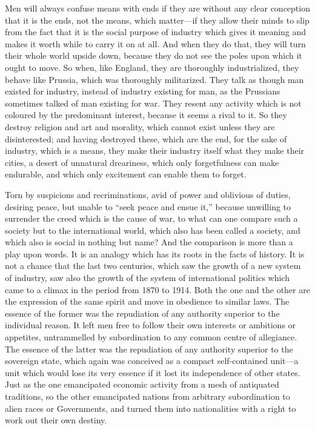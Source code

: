 \documentclass{book}
\begin{document}
Men will always confuse means with ends if they are without any clear conception that it is the ends, not the means, which matter—if they allow their minds to slip from the fact that it is the social purpose of industry which gives it meaning and makes it worth while to carry it on at all. And when they do that, they will turn their whole world upside down, because they do not see the poles upon which it ought to move. So when, like England, they are thoroughly industrialized, they behave like Prussia, which was thoroughly militarized. They talk as though man existed for industry, instead of industry existing for man, as the Prussians sometimes talked of man existing for war. They resent any activity which is not coloured by the predominant interest, because it seems a rival to it. So they destroy religion and art and morality, which cannot exist unless they are disinterested; and having destroyed these, which are the end, for the sake of industry, which is a means, they make their industry itself what they make their cities, a desert of unnatural dreariness, which only forgetfulness can make endurable, and which only excitement can enable them to forget.

Torn by suspicions and recriminations, avid of power and oblivious of duties, desiring peace, but unable to “seek peace and ensue it,” because unwilling to surrender the creed which is the cause of war, to what can one compare such a society but to the international world, which also has been called a society, and which also is social in nothing but name? And the comparison is more than a play upon words. It is an analogy which has its roots in the facts of history. It is not a chance that the last two centuries, which saw the growth of a new system of industry, saw also the growth of the system of international politics which came to a climax in the period from 1870 to 1914. Both the one and the other are the expression of the same spirit and move in obedience to similar laws. The essence of the former was the repudiation of any authority superior to the individual reason. It left men free to follow their own interests or ambitions or appetites, untrammelled by subordination to any common centre of allegiance. The essence of the latter was the repudiation of any authority superior to the sovereign state, which again was conceived as a compact self-contained unit—a unit which would lose its very essence if it lost its independence of other states. Just as the one emancipated economic activity from a mesh of antiquated traditions, so the other emancipated nations from arbitrary subordination to alien races or Governments, and turned them into nationalities with a right to work out their own destiny.
\end{document}
